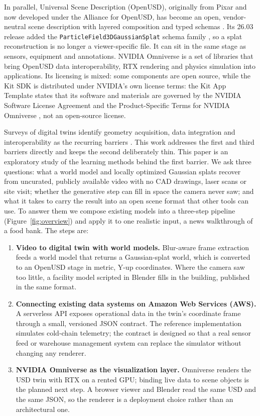 \documentclass{article}
\newcommand{\code}[1]{\texttt{\small #1}}
\begin{document}
In parallel, Universal Scene Description (OpenUSD), originally from Pixar and
now developed under the Alliance for OpenUSD, has become an open,
vendor-neutral scene description with layered composition and typed schemas
\cite{openusd,aousd}. Its 26.03 release added the
\code{ParticleField3DGaussianSplat} schema family
\cite{aousd2603,usd_gsplat_schema}, so a splat reconstruction is no longer a
viewer-specific file. It can sit in the same stage as sensors, equipment and
annotations. NVIDIA Omniverse \cite{omniverse} is a set of libraries that bring
OpenUSD data interoperability, RTX rendering and physics simulation into
applications. Its licensing is mixed: some
components are open source, while the Kit SDK is distributed under NVIDIA's
own license terms: the Kit App Template states that its software and materials
are governed by the NVIDIA Software License Agreement and the Product-Specific
Terms for NVIDIA Omniverse \cite{kit_app_template}, not an open-source
license.

Surveys of digital twins identify geometry acquisition, data integration and
interoperability as the recurring barriers \cite{tao2019digital,fuller2020digital}.
This work addresses the first and third barriers directly and keeps the second
deliberately thin. This paper is an exploratory study of the learning
methods behind the first barrier. We ask three questions: what a world model
and locally optimized Gaussian splats recover from uncurated, publicly
available video with no CAD drawings, laser scans or site visit; whether the
generative step can fill in space the camera never saw; and what it takes to
carry the result into an open scene format that other tools can use. To
answer them we compose existing models into a three-step pipeline
(Figure~\ref{fig:overview}) and apply it to one realistic input, a news
walkthrough of a food bank. The steps are:
\begin{enumerate}
  \item \textbf{Video to digital twin with world models.} Blur-aware frame
        extraction feeds a world model that returns a Gaussian-splat world,
        which is converted to an OpenUSD stage in metric, Y-up coordinates.
        Where the camera saw too little, a facility model scripted in Blender
        fills in the building, published in the same format.
  \item \textbf{Connecting existing data systems on Amazon Web Services (AWS).}
        A serverless API exposes operational data in the twin's coordinate
        frame through a small, versioned JSON contract. The reference
        implementation simulates cold-chain telemetry; the contract is
        designed so that a real sensor feed or warehouse management system
        can replace the simulator without changing any renderer.
  \item \textbf{NVIDIA Omniverse as the visualization layer.} Omniverse
        renders the USD twin with RTX on a rented GPU; binding live data to
        scene objects is the planned next step. A
        browser viewer and Blender read the same USD and the same JSON, so
        the renderer is a deployment choice rather than an architectural one.
\end{enumerate}
\end{document}
